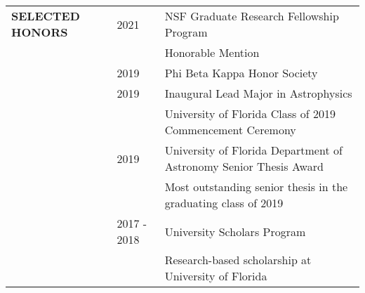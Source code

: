 \documentclass{article}
\begin{document}
\begin{tabular}{p{4cm}p{2.2cm}l}
    \large{\textbf{SELECTED \newline HONORS}} & 2021  & NSF Graduate Research Fellowship Program \vspace{-0.5cm}\\
    && \small Honorable Mention \vspace{0.125cm}\\
    
    & 2019 & Phi Beta Kappa Honor Society \vspace{0.125cm}\\

    \vspace{0.25cm}
    & 2019 & Inaugural Lead Major in Astrophysics \\
    && \small University of Florida Class of 2019 Commencement Ceremony \vspace{0.125cm}\\
    
    & 2019 & University of Florida Department of Astronomy Senior Thesis Award \\
    && \small Most outstanding senior thesis in the graduating class of 2019 \vspace{0.125cm}\\
    
    
    & 2017 - 2018 & University Scholars Program \\
    && \small Research-based scholarship at University of Florida \vspace{0.125cm}\\
    
    
    

\end{tabular}
\end{document}
